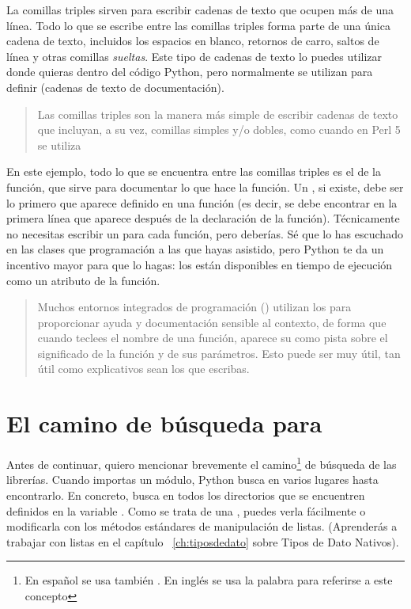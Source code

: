 La comillas triples sirven para escribir cadenas de texto que ocupen más de una línea. Todo lo que se escribe entre las comillas triples forma parte de una única cadena de texto, incluidos los espacios en blanco, retornos de carro, saltos de línea y otras comillas \emph{sueltas}. Este tipo de cadenas de texto lo puedes utilizar donde quieras dentro del código Python, pero normalmente se utilizan para definir  (cadenas de texto de documentación).

\begin{quote}
Las comillas triples son la manera más simple de escribir cadenas de texto que incluyan, a su vez, comillas simples y/o dobles, como cuando en Perl 5 se utiliza 
\end{quote}


En este ejemplo, todo lo que se encuentra entre las comillas triples es el  de la función, que sirve para documentar lo que hace la función. Un , si existe, debe ser lo primero que aparece definido en una función (es decir, se debe encontrar en la primera línea que aparece después de la declaración de la función). Técnicamente no necesitas escribir un  para cada función, pero deberías. Sé que lo has escuchado en las clases que programación a las que hayas asistido, pero Python te da un incentivo mayor para que lo hagas: los  están disponibles en tiempo de ejecución como un atributo de la función.

\begin{quote}
Muchos entornos integrados de programación () utilizan los  para proporcionar ayuda y documentación sensible al contexto, de forma que cuando teclees el nombre de una función, aparece su  como pista sobre el significado de la función y de sus parámetros. Esto puede ser muy útil, tan útil como explicativos sean los  que escribas.
\end{quote}

\section{El camino de búsqueda para }\label{sc:search_path}

Antes de continuar, quiero mencionar brevemente el camino\footnote{En español se usa también . En inglés se usa la palabra  para referirse a este concepto} de búsqueda de las librerías. Cuando importas un módulo, Python busca en varios lugares hasta encontrarlo. En concreto, busca en todos los directorios que se encuentren definidos en la variable . Como se trata de una , puedes verla fácilmente o modificarla con los métodos estándares de manipulación de listas. (Aprenderás a trabajar con listas en el capítulo ~\ref{ch:tiposdedato} sobre Tipos de Dato Nativos).

